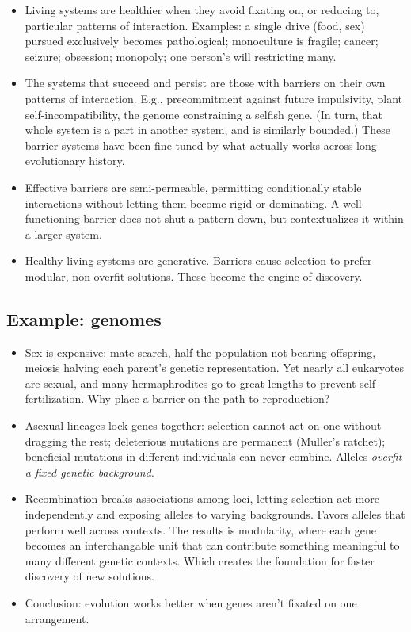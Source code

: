 \documentclass[11pt]{article}
\begin{document}
\begin{itemize}
  \item Living systems are healthier when they avoid fixating on, or reducing to, particular patterns of interaction. Examples: a single drive (food, sex) pursued exclusively becomes pathological; monoculture is fragile; cancer; seizure; obsession; monopoly; one person's will restricting many. 
  \item The systems that succeed and persist are those with barriers on their own patterns of interaction. E.g., precommitment against future impulsivity, plant self-incompatibility, the genome constraining a selfish gene. (In turn, that whole system is a part in another system, and is similarly bounded.) These barrier systems have been fine-tuned by what actually works across long evolutionary history.
  \item Effective barriers are semi-permeable, permitting conditionally stable interactions without letting them become rigid or dominating. A well-functioning barrier does not shut a pattern down, but contextualizes it within a larger system.
  \item Healthy living systems are generative. Barriers cause selection to prefer modular, non-overfit solutions. These become the engine of discovery.
\end{itemize}


\subsection*{Example: genomes}

\begin{itemize}
  \item Sex is expensive: mate search, half the population not bearing offspring, meiosis halving each parent's genetic representation. Yet nearly all eukaryotes are sexual, and many hermaphrodites go to great lengths to prevent self-fertilization. Why place a barrier on the path to reproduction?
  \item Asexual lineages lock genes together: selection cannot act on one without dragging the rest; deleterious mutations are permanent (Muller's ratchet); beneficial mutations in different individuals can never combine. Alleles \textit{overfit a fixed genetic background}.
  \item Recombination breaks associations among loci, letting selection act more independently and exposing alleles to varying backgrounds. Favors alleles that perform well across contexts. The results is modularity, where each gene becomes an interchangable unit that can contribute something meaningful to many different genetic contexts. Which creates the foundation for faster discovery of new solutions.
  \item Conclusion: evolution works better when genes aren't fixated on one arrangement.
\end{itemize}
\end{document}
